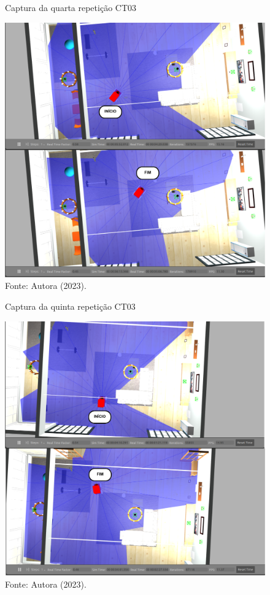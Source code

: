 \begin{figure}[H]
    \centering
    \caption{Captura da quarta repetição CT03}
    \includegraphics[scale=0.5]{ct03_4.png}
    \caption*{Fonte: Autora (2023).}
    \label{fig:ct03_4}
\end{figure}

\begin{figure}[H]
    \centering
    \caption{Captura da quinta repetição CT03}
    \includegraphics[scale=0.5]{ct03_5.png}
    \caption*{Fonte: Autora (2023).}
    \label{fig:ct03_5}
\end{figure}

